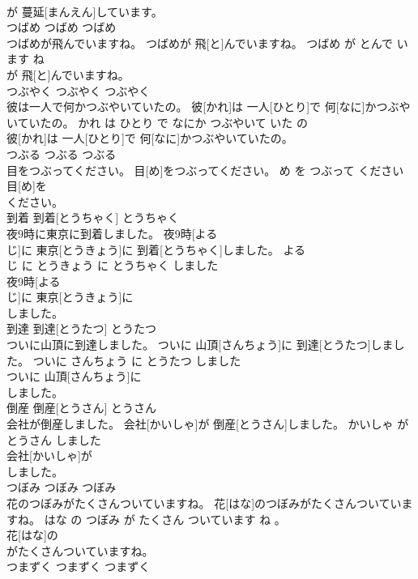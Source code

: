 \documentclass[8pt]{extreport}
\begin{document}
\begin{CJK}{UTF8}{min}
\\	が 蔓延[まんえん]しています。			
\\	つばめ	つばめ	つばめ	
\\	つばめが飛んでいますね。	つばめが 飛[と]んでいますね。	つばめ が とんで います ね	
\\	が 飛[と]んでいますね。			
\\	つぶやく	つぶやく	つぶやく	
\\	彼は一人で何かつぶやいていたの。	彼[かれ]は 一人[ひとり]で 何[なに]かつぶやいていたの。	かれ は ひとり で なにか つぶやいて いた の	
\\	彼[かれ]は 一人[ひとり]で 何[なに]かつぶやいていたの。			
\\	つぶる	つぶる	つぶる	
\\	目をつぶってください。	目[め]をつぶってください。	め を つぶって ください	
\\	目[め]を
\\	ください。			
\\	到着	到着[とうちゃく]	とうちゃく	
\\	夜9時に東京に到着しました。	夜9時[よる 
\\	じ]に 東京[とうきょう]に 到着[とうちゃく]しました。	よる 
\\	じ に とうきょう に とうちゃく しました	
\\	夜9時[よる 
\\	じ]に 東京[とうきょう]に
\\	しました。			
\\	到達	到達[とうたつ]	とうたつ	
\\	ついに山頂に到達しました。	ついに 山頂[さんちょう]に 到達[とうたつ]しました。	ついに さんちょう に とうたつ しました	
\\	ついに 山頂[さんちょう]に
\\	しました。			
\\	倒産	倒産[とうさん]	とうさん	
\\	会社が倒産しました。	会社[かいしゃ]が 倒産[とうさん]しました。	かいしゃ が とうさん しました	
\\	会社[かいしゃ]が
\\	しました。			
\\	つぼみ	つぼみ	つぼみ	
\\	花のつぼみがたくさんついていますね。	花[はな]のつぼみがたくさんついていますね。	はな の つぼみ が たくさん ついています ね 。	
\\	花[はな]の
\\	がたくさんついていますね。			
\\	つまずく	つまずく	つまずく	

\end{CJK}
\end{document}
